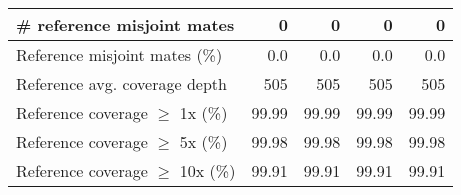 \documentclass[12pt,a4paper]{article}
\begin{document}
\begin{table}[ht]
\begin{center}
\begin{tabular}{|l*{4}{|r}|}
\# reference misjoint mates & 0 & 0 & 0 & 0 \\ \hline
Reference misjoint mates (\%) & 0.0 & 0.0 & 0.0 & 0.0 \\ \hline
Reference avg. coverage depth & 505 & 505 & 505 & 505 \\ \hline
Reference coverage $\geq$ 1x (\%) & 99.99 & 99.99 & 99.99 & 99.99 \\ \hline
Reference coverage $\geq$ 5x (\%) & 99.98 & 99.98 & 99.98 & 99.98 \\ \hline
Reference coverage $\geq$ 10x (\%) & 99.91 & 99.91 & 99.91 & 99.91 \\ \hline
\end{tabular}
\end{center}
\end{table}
\end{document}
